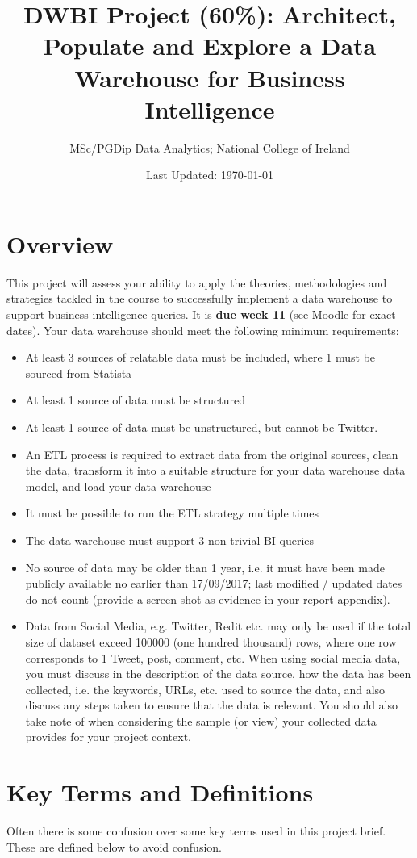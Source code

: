 \documentclass{article}[a4paper,12pt]
\title{DWBI Project (60\%): Architect, Populate and Explore a Data Warehouse for Business Intelligence}
\author{MSc/PGDip Data Analytics; National College of Ireland}
\date{Last Updated: \today}
\begin{document}
\maketitle

\section{Overview}
This project will assess your ability to apply the theories, methodologies and strategies tackled in the course to successfully implement a data warehouse to support business intelligence queries. It is \textbf{due week 11} (see Moodle for exact dates). Your data warehouse should meet the following minimum requirements:
\begin{itemize}
\item At least 3 sources of relatable data must be included, where 1 must be sourced from Statista  
\item At least 1 source of data must be structured 
\item At least 1 source of data must be unstructured, but cannot be Twitter. 
\item An ETL process is required to extract data from the original sources, clean the data, transform it into a suitable structure for your data warehouse data model, and load your data warehouse
\item It must be possible to run the ETL strategy multiple times
\item The data warehouse must support 3 non-trivial BI queries
\item No source of data may be older than 1 year, i.e. it must have been made publicly available no earlier than 17/09/2017; last modified / updated dates do not count (provide a screen shot as evidence in your report appendix).
\item Data from Social Media, e.g. Twitter, Redit etc. may only be used if the total size of dataset exceed 100000 (one hundred thousand) rows, where one row corresponds to 1 Tweet, post, comment, etc. When using social media data, you must discuss in the description of the data source, how the data has been collected, i.e. the keywords, URLs, etc. used to source the data, and also discuss any steps taken to ensure that the data is relevant. You should also take note of \cite{gonzalez2014assessing} when considering the sample (or view) your collected data provides for your project context.
\end{itemize}

\section{Key Terms and Definitions}
Often there is some confusion over some key terms used in this project brief. These are defined below to avoid confusion.
\end{document}
